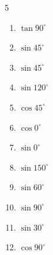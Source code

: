 \begin{multicols}{5}
\begin{enumerate}

  \item $\displaystyle \tan{90^\circ}$

        \phantom{$\displaystyle なし$}

  \item $\displaystyle \sin{45^\circ}$


  \item $\displaystyle \sin{45^\circ}$


  \item $\displaystyle \sin{120^\circ}$


  \item $\displaystyle \cos{45^\circ}$


  \item $\displaystyle \cos{0^\circ}$

        \phantom{$\displaystyle =1$}

\columnbreak %

  \item $\displaystyle \sin{0^\circ}$

        \phantom{$\displaystyle =0$}

  \item $\displaystyle \sin{150^\circ}$


  \item $\displaystyle \sin{60^\circ}$


  \item $\displaystyle \sin{90^\circ}$

        \phantom{$\displaystyle =1$}

  \item $\displaystyle \sin{30^\circ}$


  \item $\displaystyle \cos{90^\circ}$

        \phantom{$\displaystyle =0$}


\end{enumerate}
\end{multicols}
